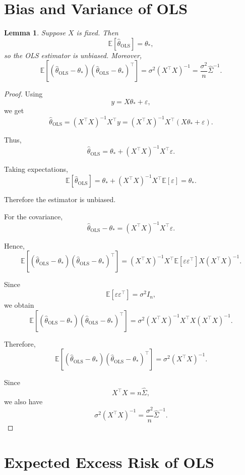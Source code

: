 \documentclass[12pt,oneside]{book}
\numberwithin{equation}{section}
\theoremstyle{definition}
\theoremstyle{plain}
\newtheorem{lemma}{Lemma}[section]
\theoremstyle{remark}
\newcommand{\E}{\mathbb{E}}
\begin{document}
\section{Bias and Variance of OLS}

\begin{lemma}
Suppose $X$ is fixed. Then
\[
\E[\widehat{\theta}_{\mathrm{OLS}}]=\theta_*,
\]
so the OLS estimator is unbiased. Moreover,
\[
\E\left[
(\widehat{\theta}_{\mathrm{OLS}}-\theta_*)
(\widehat{\theta}_{\mathrm{OLS}}-\theta_*)^\top
\right]
=
\sigma^2(X^\top X)^{-1}
=
\frac{\sigma^2}{n}\widehat{\Sigma}^{-1}.
\]
\end{lemma}

\begin{proof}
Using
\[
y=X\theta_*+\varepsilon,
\]
we get
\[
\widehat{\theta}_{\mathrm{OLS}}
=
(X^\top X)^{-1}X^\top y
=
(X^\top X)^{-1}X^\top(X\theta_*+\varepsilon).
\]

Thus,
\[
\widehat{\theta}_{\mathrm{OLS}}
=
\theta_*+(X^\top X)^{-1}X^\top\varepsilon.
\]

Taking expectations,
\[
\E[\widehat{\theta}_{\mathrm{OLS}}]
=
\theta_*+(X^\top X)^{-1}X^\top\E[\varepsilon]
=
\theta_*.
\]

Therefore the estimator is unbiased.

For the covariance,
\[
\widehat{\theta}_{\mathrm{OLS}}-\theta_*
=
(X^\top X)^{-1}X^\top\varepsilon.
\]

Hence,
\[
\E\left[
(\widehat{\theta}_{\mathrm{OLS}}-\theta_*)
(\widehat{\theta}_{\mathrm{OLS}}-\theta_*)^\top
\right]
=
(X^\top X)^{-1}X^\top
\E[\varepsilon\varepsilon^\top]
X(X^\top X)^{-1}.
\]

Since
\[
\E[\varepsilon\varepsilon^\top]=\sigma^2I_n,
\]
we obtain
\[
\E\left[
(\widehat{\theta}_{\mathrm{OLS}}-\theta_*)
(\widehat{\theta}_{\mathrm{OLS}}-\theta_*)^\top
\right]
=
\sigma^2(X^\top X)^{-1}X^\top X(X^\top X)^{-1}.
\]

Therefore,
\[
\E\left[
(\widehat{\theta}_{\mathrm{OLS}}-\theta_*)
(\widehat{\theta}_{\mathrm{OLS}}-\theta_*)^\top
\right]
=
\sigma^2(X^\top X)^{-1}.
\]

Since
\[
X^\top X=n\widehat{\Sigma},
\]
we also have
\[
\sigma^2(X^\top X)^{-1}
=
\frac{\sigma^2}{n}\widehat{\Sigma}^{-1}.
\]
\end{proof}

\section{Expected Excess Risk of OLS}
\end{document}
